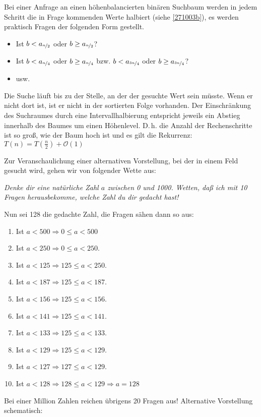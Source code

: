 \documentclass[ngerman,draft,parskip=half*,twoside]{scrreprt}
\theoremstyle{break}
\theoremstyle{nonumberbreak}
\newcommand*{\OO}{\mathcal{O}}      %
\begin{document}
Bei einer Anfrage an einen höhenbalancierten binären Suchbaum werden in jedem Schritt die in Frage kommenden Werte halbiert (siehe \autoref{271003b}), es
werden praktisch Fragen der folgenden Form gestellt.
\begin{itemize}
\item Ist  $b < a_{\nicefrac{n}{2}}$ oder $b \geq a_{\nicefrac{n}{2}}$?
\item Ist $b < a_{\nicefrac{n}{4}}$ oder $b\geq a_{\nicefrac{n}{4}}$
  bzw. $b < a_{\nicefrac{3n}{4}}$ oder $b\geq a_{\nicefrac{3n}{4}}$?
\item usw.
\end{itemize}

Die Suche läuft bis zu der Stelle, an der der gesuchte Wert sein müsste. Wenn er nicht dort ist, ist er nicht in der sortierten Folge
vorhanden.
%
Der Einschränkung des Suchraumes durch eine Intervallhalbierung entspricht jeweils ein Abstieg innerhalb des Baumes um einen
Höhenlevel.
D.\,h. die Anzahl der Rechenschritte ist so groß, wie der Baum hoch ist und es gilt die Rekurrenz: 
$T(n)=T(\frac{n}{2}) + \OO(1)$

Zur Veranschaulichung einer alternativen Vorstellung, bei der in einem Feld gesucht wird, gehen wir von folgender Wette aus:

\textit{Denke dir eine natürliche Zahl $a$ zwischen 0 und 1000. Wetten, daß ich mit 10 Fragen herausbekomme, welche Zahl du dir gedacht
hast!}

Nun sei 128 die gedachte Zahl, die Fragen sähen dann so aus:
\begin{enumerate}
\item Ist $a<500\Rightarrow 0\leq a<500$
\item Ist $a<250\Rightarrow 0\leq a<250$.
\item Ist $a<125\Rightarrow 125\leq a<250$.
\item Ist $a<187\Rightarrow 125\leq a<187$.
\item Ist $a<156\Rightarrow 125\leq a<156$.
\item Ist $a<141\Rightarrow 125\leq a<141$.
\item Ist $a<133\Rightarrow 125\leq a <133$.
\item Ist $a<129\Rightarrow 125\leq a<129$.
\item Ist $a<127\Rightarrow 127\leq a<129$.
\item Ist $a<128\Rightarrow 128\leq a<129 \Rightarrow a=128$
\end{enumerate}
Bei einer Million Zahlen reichen übrigens 20 Fragen aus!
% 
Alternative Vorstellung schematisch:
\end{document}
